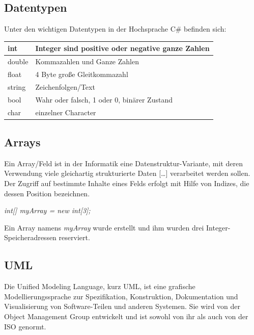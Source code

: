 \documentclass[12pt,a4paper]{article}
\begin{document}
\subsection{Datentypen}
    Unter den wichtigen Datentypen in der Hochsprache C\# befinden sich:
    \begin{table}[h]
        \centering
        \begin{tabularx}{17cm}{|X|X|}
            \hline
            int & Integer sind positive oder negative ganze Zahlen\\
            \hline
            double & Kommazahlen und Ganze Zahlen\\
            \hline
            float & 4 Byte große Gleitkommazahl\\
            \hline
            string & Zeichenfolgen/Text\\
            \hline
            bool & Wahr oder falsch, 1 oder 0, binärer Zustand\\
            \hline
            char & einzelner Character\\
            \hline
        \end{tabularx}
    \end{table}

\subsection{Arrays}
    Ein Array/Feld ist in der Informatik eine Datenstruktur-Variante, mit deren Verwendung viele gleichartig strukturierte Daten […] verarbeitet werden sollen. Der Zugriff auf bestimmte Inhalte eines Felds erfolgt mit Hilfe von Indizes, die dessen Position bezeichnen.
    \begin{center}
        \textit{int[] myArray = new int[3];}
    \end{center}
    Ein Array namens \textit{myArray} wurde erstellt und ihm wurden drei Integer-Speicheradressen reserviert.

\subsection{UML}
    Die Unified Modeling Language, kurz UML, ist eine grafische Modellierungssprache zur Spezifikation, Konstruktion, Dokumentation und Visualisierung von Software-Teilen und anderen Systemen. Sie wird von der Object Management Group entwickelt und ist sowohl von ihr als auch von der ISO genormt.
\end{document}
